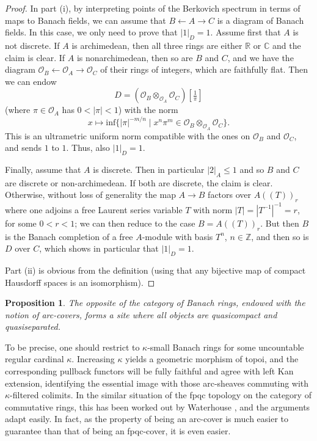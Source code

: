 \documentclass[11pt]{amsart}
\numberwithin{equation}{section}
\numberwithin{theorem}{section}
\newtheorem{proposition}[theorem]{Proposition}
\theoremstyle{definition}
\begin{document}
\begin{proof} In part (i), by interpreting points of the Berkovich spectrum in terms of maps to Banach fields, we can assume that $B\leftarrow A\to C$ is a diagram of Banach fields. In this case, we only need to prove that $|1|_D=1$. Assume first that $A$ is not discrete. If $A$ is archimedean, then all three rings are either $\mathbb R$ or $\mathbb C$ and the claim is clear. If $A$ is nonarchimedean, then so are $B$ and $C$, and we have the diagram $\mathcal O_B\leftarrow \mathcal O_A\to \mathcal O_C$ of their rings of integers, which are faithfully flat. Then we can endow
\[
D = (\mathcal O_B\otimes_{\mathcal O_A} \mathcal O_C)[\tfrac 1\pi]
\]
(where $\pi\in \mathcal O_A$ has $0<|\pi|<1$) with the norm
\[
x\mapsto \mathrm{inf} \{|\pi|^{-m/n}\mid x^n \pi^m\in \mathcal O_B\otimes_{\mathcal O_A} \mathcal O_C\}.
\]
This is an ultrametric uniform norm compatible with the ones on $\mathcal O_B$ and $\mathcal O_C$, and sends $1$ to $1$. Thus, also $|1|_D=1$.

Finally, assume that $A$ is discrete. Then in particular $|2|_A\leq 1$ and so $B$ and $C$ are discrete or non-archimedean. If both are discrete, the claim is clear. Otherwise, without loss of generality the map $A\to B$ factors over $A((T))_r$ where one adjoins a free Laurent series variable $T$ with norm $|T|=|T^{-1}|^{-1}=r$, for some $0<r<1$; we can then reduce to the case $B=A((T))_r$. But then $B$ is the Banach completion of a free $A$-module with basis $T^n$, $n\in \mathbb Z$, and then so is $D$ over $C$, which shows in particular that $|1|_D=1$.

Part (ii) is obvious from the definition (using that any bijective map of compact Hausdorff spaces is an isomorphism).
\end{proof}

\begin{proposition} The opposite of the category of Banach rings, endowed with the notion of arc-covers, forms a site where all objects are quasicompact and quasiseparated.
\end{proposition}

To be precise, one should restrict to $\kappa$-small Banach rings for some uncountable regular cardinal $\kappa$. Increasing $\kappa$ yields a geometric morphism of topoi, and the corresponding pullback functors will be fully faithful and agree with left Kan extension, identifying the essential image with those arc-sheaves commuting with $\kappa$-filtered colimits. In the similar situation of the fpqc topology on the category of commutative rings, this has been worked out by Waterhouse \cite{Waterhouse}, and the arguments adapt easily. In fact, as the property of being an arc-cover is much easier to guarantee than that of being an fpqc-cover, it is even easier.
\end{document}
